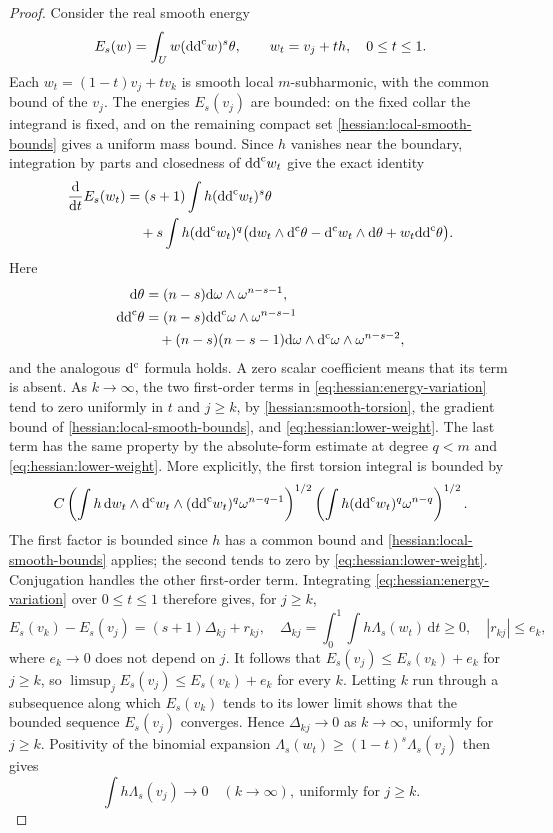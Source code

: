 \begin{proof}
Consider the real smooth energy
\[
 E_s(w)=\int_U w(\mathrm{dd}^{\mathrm{c}} w)^s\theta,
 \qquad w_t=v_j+t h,\quad0\leq t\leq1.
\]
Each $w_t=(1-t)v_j+tv_k$ is smooth local $m$-subharmonic, with the
common bound of the $v_j$. The energies $E_s(v_j)$ are bounded: on
the fixed collar the integrand is fixed, and on the remaining compact
set \cref{hessian:local-smooth-bounds} gives a uniform mass bound.
Since $h$ vanishes near the boundary,
integration by parts and closedness of $\mathrm{dd}^{\mathrm{c}} w_t$ give the exact
identity
\begin{equation}\label{eq:hessian:energy-variation}
 \begin{split}
 \frac{\mathrm d}{\mathrm dt}E_s(w_t)
  &=(s+1)\int h(\mathrm{dd}^{\mathrm{c}} w_t)^s\theta\\
  &\quad+s\int h(\mathrm{dd}^{\mathrm{c}} w_t)^q
       \bigl(\mathrm dw_t\wedge\mathrm d^{\mathrm c}\theta
           -\mathrm d^{\mathrm c} w_t\wedge\mathrm d\theta+w_t\mathrm{dd}^{\mathrm{c}}\theta\bigr).
 \end{split}
\end{equation}
Here
\[
 \begin{aligned}
 \mathrm d\theta&=(n-s)\mathrm d\omega\wedge\omega^{n-s-1},\\
 \mathrm{dd}^{\mathrm{c}}\theta&=(n-s)\mathrm{dd}^{\mathrm{c}}\omega\wedge\omega^{n-s-1}\\
 &\quad+(n-s)(n-s-1)\mathrm d\omega\wedge\mathrm d^{\mathrm c}\omega
                                           \wedge\omega^{n-s-2},
 \end{aligned}
\]
and the analogous $\mathrm d^{\mathrm c}$ formula holds. A zero scalar coefficient
means that its term is absent. As $k\to\infty$, the two first-order
terms in \eqref{eq:hessian:energy-variation} tend to zero uniformly
in $t$ and $j\geq k$, by \cref{hessian:smooth-torsion}, the gradient
bound of \cref{hessian:local-smooth-bounds}, and
\eqref{eq:hessian:lower-weight}. The last term has the same
property by the absolute-form estimate at degree $q<m$ and
\eqref{eq:hessian:lower-weight}.
More explicitly, the first torsion integral is bounded by
\[
 C\left(\int h\,\mathrm dw_t\wedge\mathrm d^{\mathrm c} w_t
                     \wedge(\mathrm{dd}^{\mathrm{c}} w_t)^q\omega^{n-q-1}\right)^{1/2}
   \left(\int h(\mathrm{dd}^{\mathrm{c}} w_t)^q\omega^{n-q}\right)^{1/2}.
\]
The first factor is bounded since $h$ has a common bound and
\cref{hessian:local-smooth-bounds} applies; the second tends to
zero by \eqref{eq:hessian:lower-weight}. Conjugation handles the
other first-order term.
Integrating \eqref{eq:hessian:energy-variation} over $0\leq t\leq1$
therefore gives, for $j\geq k$,
\[
 E_s(v_k)-E_s(v_j)=(s+1)\Delta_{kj}+r_{kj},
 \quad
 \Delta_{kj}=\int_0^1\int h\Lambda_s(w_t)\,\mathrm dt\geq0,
 \quad |r_{kj}|\leq e_k,
\]
where $e_k\to0$ does not depend on $j$.
It follows that $E_s(v_j)\leq E_s(v_k)+e_k$ for $j\geq k$, so
$\limsup_jE_s(v_j)\leq E_s(v_k)+e_k$ for every $k$. Letting $k$ run
through a subsequence along which $E_s(v_k)$ tends to its lower
limit shows that the bounded sequence $E_s(v_j)$ converges. Hence
$\Delta_{kj}\to0$ as $k\to\infty$, uniformly for $j\geq k$.
Positivity of the binomial expansion
$\Lambda_s(w_t)\geq(1-t)^s \Lambda_s(v_j)$ then gives
\begin{equation}\label{eq:hessian:self-weight}
 \int h\Lambda_s(v_j)\longrightarrow0
             \quad(k\to\infty),\ \text{uniformly for }j\geq k.
\end{equation}


\end{proof}
